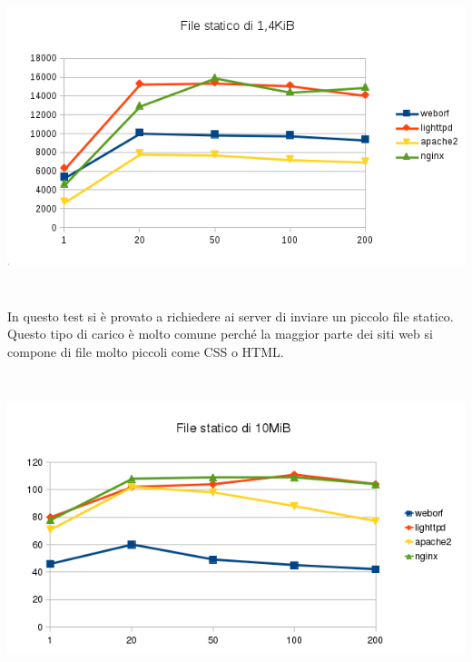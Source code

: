 \documentclass[a4paper,11pt]{article}
\makeatletter
\newcommand\captionof[1]{\def\@captype{#1}\caption}
\makeatother
\begin{document}
\begin{minipage}{16cm}
\includegraphics[width=16cm,height=8.999cm]{tesi-img3.png}
\captionof{figure}{Comparazione velocit\`a sull{\textquotesingle}invio
di file statico della dimensione di 1,4KiB}
\end{minipage}

{\sffamily
In questo test si \`e provato a richiedere ai server di inviare un
piccolo file statico. Questo tipo di carico \`e molto comune perch\'e
la maggior parte dei siti web si compone di file molto piccoli come CSS
o HTML.}


\bigskip

\begin{minipage}{16cm}
\includegraphics[width=16cm,height=8.999cm]{tesi-img4.png}
\captionof{figure}{Comparazione velocit\`a sull{\textquotesingle}invio
di file statico della dimensione di 10MiB}
\end{minipage}
\end{document}

